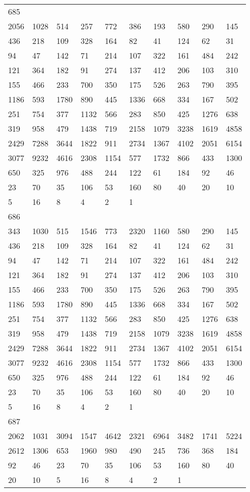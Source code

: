 \begin{longtable}{*{10}{l}}
685&&&&&&&&&\\
2056& 1028& 514& 257& 772& 386& 193& 580& 290& 145\\
436& 218& 109& 328& 164& 82& 41& 124& 62& 31\\
94& 47& 142& 71& 214& 107& 322& 161& 484& 242\\
121& 364& 182& 91& 274& 137& 412& 206& 103& 310\\
155& 466& 233& 700& 350& 175& 526& 263& 790& 395\\
1186& 593& 1780& 890& 445& 1336& 668& 334& 167& 502\\
251& 754& 377& 1132& 566& 283& 850& 425& 1276& 638\\
319& 958& 479& 1438& 719& 2158& 1079& 3238& 1619& 4858\\
2429& 7288& 3644& 1822& 911& 2734& 1367& 4102& 2051& 6154\\
3077& 9232& 4616& 2308& 1154& 577& 1732& 866& 433& 1300\\
650& 325& 976& 488& 244& 122& 61& 184& 92& 46\\
23& 70& 35& 106& 53& 160& 80& 40& 20& 10\\
5& 16& 8& 4& 2& 1& \\

686&&&&&&&&&\\
343& 1030& 515& 1546& 773& 2320& 1160& 580& 290& 145\\
436& 218& 109& 328& 164& 82& 41& 124& 62& 31\\
94& 47& 142& 71& 214& 107& 322& 161& 484& 242\\
121& 364& 182& 91& 274& 137& 412& 206& 103& 310\\
155& 466& 233& 700& 350& 175& 526& 263& 790& 395\\
1186& 593& 1780& 890& 445& 1336& 668& 334& 167& 502\\
251& 754& 377& 1132& 566& 283& 850& 425& 1276& 638\\
319& 958& 479& 1438& 719& 2158& 1079& 3238& 1619& 4858\\
2429& 7288& 3644& 1822& 911& 2734& 1367& 4102& 2051& 6154\\
3077& 9232& 4616& 2308& 1154& 577& 1732& 866& 433& 1300\\
650& 325& 976& 488& 244& 122& 61& 184& 92& 46\\
23& 70& 35& 106& 53& 160& 80& 40& 20& 10\\
5& 16& 8& 4& 2& 1& \\

687&&&&&&&&&\\
2062& 1031& 3094& 1547& 4642& 2321& 6964& 3482& 1741& 5224\\
2612& 1306& 653& 1960& 980& 490& 245& 736& 368& 184\\
92& 46& 23& 70& 35& 106& 53& 160& 80& 40\\
20& 10& 5& 16& 8& 4& 2& 1& \\


\end{longtable}
